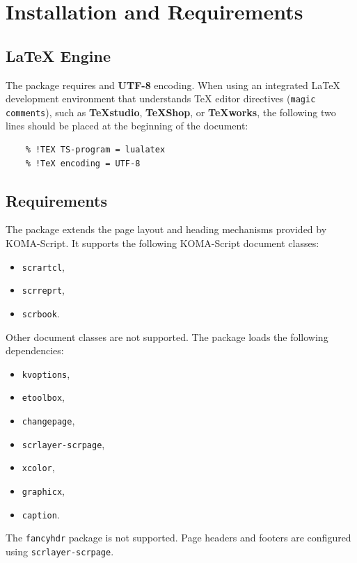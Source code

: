 \documentclass[
11pt,
a4paper,
oneside
]{scrbook}
\begin{document}

\chapter{Installation and Requirements}
\label{chap:installation}
\begin{center}
\end{center}

\section{\LaTeX{} Engine}

The \mdlayout{} package requires \LuaLaTeX{} and \textbf{UTF-8}
encoding. When using an integrated \LaTeX{} development environment that
understands \TeX{} editor directives (\texttt{magic comments}), such
as \textbf{TeXstudio}, \textbf{\TeX Shop}, or \textbf{\TeX works},
the following two lines should be placed at the beginning of the
document:
\begin{verbatim}
	% !TEX TS-program = lualatex
	% !TeX encoding = UTF-8
\end{verbatim}

\section{Requirements}

The \mdlayout{} package extends the page layout and heading mechanisms
provided by KOMA-Script.
It supports the following KOMA-Script document classes:

\begin{itemize}
	\item \texttt{scrartcl},
	\item \texttt{scrreprt},
	\item \texttt{scrbook}.
\end{itemize}
Other document classes are not supported.
The package loads the following dependencies:
\begin{itemize}
	\item \texttt{kvoptions},
	\item \texttt{etoolbox},
	\item \texttt{changepage},
	\item \texttt{scrlayer-scrpage},
	\item \texttt{xcolor},
	\item \texttt{graphicx},
	\item \texttt{caption}.
\end{itemize}
The \texttt{fancyhdr} package is not supported.
Page headers and footers are configured using
\texttt{scrlayer-scrpage}.
\end{document}
